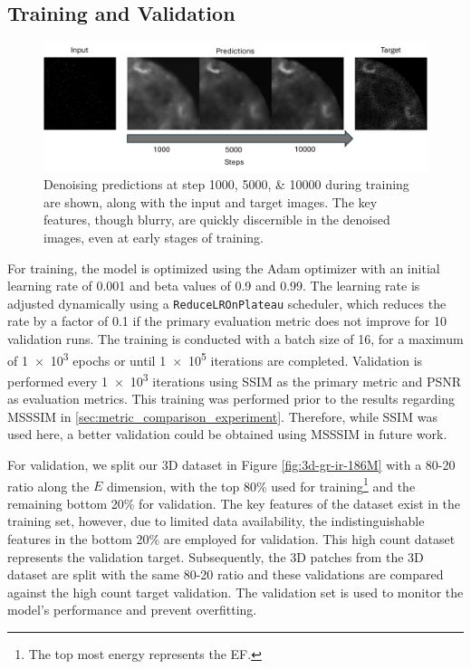 \subsection{Training and Validation}
\begin{figure}
    \centering
    \includegraphics[width=1\linewidth]{images/training_progress_example2.pdf}
    \caption{Denoising predictions at step \numlist{1000;5000;10000} during training are shown, along with the input and target images. The key features, though blurry, are quickly discernible in the denoised images, even at early stages of training.}
    \label{fig:training-progress-example}
\end{figure}
For training, the model is optimized using the Adam optimizer with an initial learning rate of \num{0.001} and beta values of \num{0.9} and \num{0.99}. The learning rate is adjusted dynamically using a \texttt{ReduceLROnPlateau} scheduler, which reduces the rate by a factor of \num{0.1} if the primary evaluation metric does not improve for \num{10} validation runs. The training is conducted with a batch size of \num{16}, for a maximum of \num{1e3} epochs or until \num{1e5} iterations are completed. Validation is performed every \num{1e3} iterations using \gls{SSIM} as the primary metric and \gls{PSNR} as evaluation metrics. This training was performed prior to the results regarding \gls{MSSSIM} in \cref{sec:metric_comparison_experiment}. Therefore, while \gls{SSIM} was used here, a better validation could be obtained using \gls{MSSSIM} in future work.

For validation, we split our 3D dataset in Figure \cref{fig:3d-gr-ir-186M} with a 80-20 ratio along the $E$ dimension, with the top 80\% used for training\footnote{The top most energy represents the \gls{EF}.} and the remaining bottom 20\% for validation. The key features of the dataset exist in the training set, however, due to limited data availability, the indistinguishable features in the bottom 20\% are employed for validation. This high count dataset represents the validation target. Subsequently, the 3D patches from the 3D dataset are split with the same 80-20 ratio and these validations are compared against the high count target validation. The validation set is used to monitor the model's performance and prevent overfitting. 


